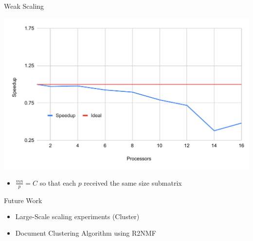 \documentclass[xcolor=dvipsnames]{beamer}
\begin{document}
\begin{frame}{Weak Scaling}
\begin{center}
\includegraphics[scale=0.5]{weak}
\end{center}
\begin{itemize}
\item $\frac{mn}{p} = C$ so that each $p$ received the same size submatrix
\end{itemize}
\end{frame}

\begin{frame}{Future Work}
\begin{itemize}
\item Large-Scale scaling experiments (Cluster)
\item Document Clustering Algorithm using R2NMF
\end{itemize}
\end{frame}
\end{document}
